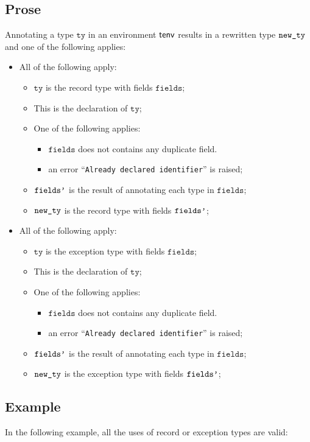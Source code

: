 \documentclass{book}
\newcommand\tty[0]{\texttt{ty}}
\newcommand\fields[0]{\texttt{fields}}
\begin{document}
\subsection{Prose}
Annotating a type $\tty$ in an environment $\textsf{tenv}$ results in a
rewritten type $\texttt{new\_ty}$ and one of the following applies:
\begin{itemize}
  \item All of the following apply:
    \begin{itemize}
      \item $\tty$ is the record type with fields $\fields$;
      \item This is the declaration of $\tty$;
      \item One of the following applies:
        \begin{itemize}
          \item $\fields$ does not contains any duplicate field.
          \item an error ``\texttt{Already declared identifier}'' is raised;
        \end{itemize}
      \item $\texttt{fields'}$ is the result of annotating each type in
        $\fields$;
      \item $\texttt{new\_ty}$ is the record type with fields $\texttt{fields'}$;
    \end{itemize}
  \item All of the following apply:
    \begin{itemize}
      \item $\tty$ is the exception type with fields $\fields$;
      \item This is the declaration of $\tty$;
      \item One of the following applies:
        \begin{itemize}
          \item $\fields$ does not contains any duplicate field.
          \item an error ``\texttt{Already declared identifier}'' is raised;
        \end{itemize}
      \item $\texttt{fields'}$ is the result of annotating each type in
        $\fields$;
      \item $\texttt{new\_ty}$ is the exception type with fields $\texttt{fields'}$;
    \end{itemize}
\end{itemize}


\subsection{Example}
In the following example, all the uses of record or exception types are valid:
\end{document}
